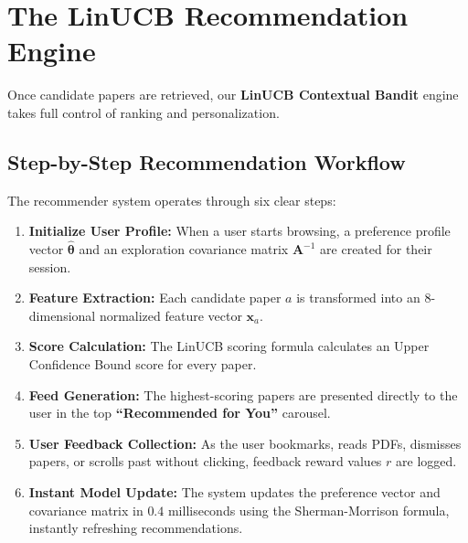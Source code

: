\documentclass[11pt,a4paper]{article}
\begin{document}
\section{The LinUCB Recommendation Engine}

Once candidate papers are retrieved, our \textbf{LinUCB Contextual Bandit} engine takes full control of ranking and personalization.

\subsection{Step-by-Step Recommendation Workflow}
The recommender system operates through six clear steps:
\begin{enumerate}[leftmargin=1.5em]
    \item \textbf{Initialize User Profile:} When a user starts browsing, a preference profile vector $\hat{\boldsymbol{\theta}}$ and an exploration covariance matrix $\mathbf{A}^{-1}$ are created for their session.
    \item \textbf{Feature Extraction:} Each candidate paper $a$ is transformed into an 8-dimensional normalized feature vector $\mathbf{x}_a$.
    \item \textbf{Score Calculation:} The LinUCB scoring formula calculates an Upper Confidence Bound score for every paper.
    \item \textbf{Feed Generation:} The highest-scoring papers are presented directly to the user in the top \textbf{``Recommended for You''} carousel.
    \item \textbf{User Feedback Collection:} As the user bookmarks, reads PDFs, dismisses papers, or scrolls past without clicking, feedback reward values $r$ are logged.
    \item \textbf{Instant Model Update:} The system updates the preference vector and covariance matrix in $0.4$ milliseconds using the Sherman-Morrison formula, instantly refreshing recommendations.
\end{enumerate}
\end{document}
